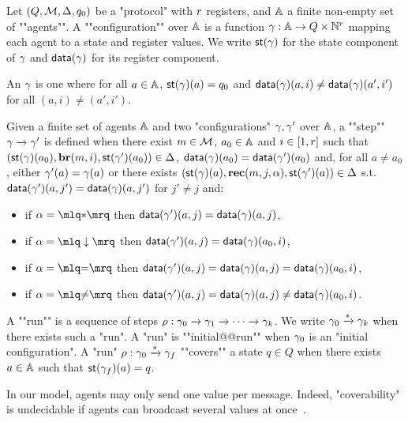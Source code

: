 \begin{definition}[Semantics]
	Let $(Q,\mathcal{M}, \Delta, q_0)$ be a "protocol" with $r$ registers, and $\mathbb{A}$ a finite non-empty set of ""agents"".
	A ""configuration"" over $\mathbb{A}$ is a function $\gamma : \mathbb{A} \to Q \times \mathbb{N}^{r}$ mapping each agent to a state and register values. 
	We write $\mathsf{st}(\gamma)$ for the state component of $\gamma$ and $\mathsf{data}(\gamma)$ for its register component.
	
	\AP An  $\gamma$ is one where for all $a \in \mathbb{A}$, $\mathsf{st}(\gamma)(a) = q_0$ and $\mathsf{data}(\gamma)(a, i) \neq \mathsf{data}(\gamma)(a', i')$ for all $(a,i) \neq (a', i')$.
	
	\AP Given a finite set of agents $\mathbb{A}$ and two "configurations" $\gamma, \gamma'$ over $\mathbb{A}$, a ""step"" $\gamma \xrightarrow{} \gamma'$ is defined when there exist $m \in \mathcal{M}$, $a_0 \in \mathbb{A}$ and $i \in [1,r]$ such that \linebreak $(\mathsf{st}(\gamma)(a_0),\textbf{br}(m, i), \mathsf{st}(\gamma')(a_0)) \in \Delta$, $\mathsf{data}(\gamma)(a_0) = \mathsf{data}(\gamma')(a_0)$ and, for all $a \ne a_0$, either $\gamma'(a) = \gamma(a)$ or there exists $(\mathsf{st}(\gamma)(a),\textbf{rec}(m, j, \alpha),\mathsf{st}(\gamma')(a)) \in \Delta$
		s.t. $\mathsf{data}(\gamma')(a, j') = \mathsf{data}(\gamma)(a, j')$ for $j' \neq j$ and:
		\begin{itemize}
				\item if $\anact = \quotemarks{\dummyact}$ 
				then $\mathsf{data}(\gamma')(a,j) = \mathsf{data}(\gamma)(a,j)$,
				\item if $\anact = \quotemarks{\enregact}$ then $\mathsf{data}(\gamma')(a,j) = \mathsf{data}(\gamma)(a_0,i)$,
				\item if $\anact = \quotemarks{\eqtestact}$ then $\mathsf{data}(\gamma')(a,j) = \mathsf{data}(\gamma)(a,j) =\mathsf{data}(\gamma)(a_0,i)$,
				\item if $\anact = \quotemarks{\diseqtestact}$ then $\mathsf{data}(\gamma')(a,j) = \mathsf{data}(\gamma)(a,j) \ne \mathsf{data}(\gamma)(a_0,i)$.
			\end{itemize}
	
	\AP A ""run"" is a sequence of steps $\rho : \gamma_0 \xrightarrow{} \gamma_1 \xrightarrow{} \cdots \xrightarrow{} \gamma_k$. 
	We write $\gamma_0 \xrightarrow{*} \gamma_k$ when there exists such a "run".
	A "run" is ""initial@@run"" when $\gamma_0$ is an "initial configuration".  
	A "run" $\rho: \gamma_0 \xrightarrow{*} \gamma_f$ ""covers"" a state $q \in Q$ when there exists $a \in \mathbb{A}$ such that $\mathsf{st}(\gamma_f)(a) = q$. 
\end{definition}
\begin{remark}
\label{rem:several_values_per_message}
In our model, agents may only send one value per message. Indeed, "coverability" is undecidable if agents can broadcast several values at once~\cite{DelzannoST13}.
\end{remark}

